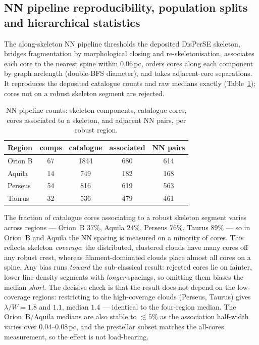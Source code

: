 \documentclass[usenatbib,twoside,twocolumn]{mnras}
\begin{document}
\subsection{NN pipeline reproducibility, population splits and hierarchical statistics}
\label{sec:nnpipeline}

The along-skeleton NN pipeline thresholds the deposited DisPerSE skeleton, bridges fragmentation by morphological closing and re-skeletonisation, associates each core to the nearest spine within $0.06$\,pc, orders cores along each component by graph arclength (double-BFS diameter), and takes adjacent-core separations. It reproduces the deposited catalogue counts and raw medians exactly (Table~\ref{tab:nnpipeline}); cores not on a robust skeleton segment are rejected.

\begin{table}
\caption{NN pipeline counts: skeleton components, catalogue cores, cores associated to a skeleton, and adjacent NN pairs, per robust region.}
\label{tab:nnpipeline}
\footnotesize
\setlength{\tabcolsep}{4pt}
\begin{tabular}{lcccc}
\toprule
Region & comps & catalogue & associated & NN pairs \\
\midrule
Orion B & 67 & 1844 & 680 & 614 \\
Aquila  & 14 & 749  & 182 & 168 \\
Perseus & 54 & 816  & 619 & 563 \\
Taurus  & 32 & 536  & 479 & 461 \\
\bottomrule
\end{tabular}
\end{table}

The fraction of catalogue cores associating to a robust skeleton segment varies across regions --- Orion~B $37\%$, Aquila $24\%$, Perseus $76\%$, Taurus $89\%$ --- so in Orion~B and Aquila the NN spacing is measured on a minority of cores. This reflects skeleton \emph{coverage}: the distributed, clustered clouds have many cores off any robust crest, whereas filament-dominated clouds place almost all cores on a spine. Any bias runs \emph{toward} the sub-classical result: rejected cores lie on fainter, lower-line-density segments with \emph{longer} spacings, so omitting them biases the median \emph{short}. The decisive check is that the result does not depend on the low-coverage regions: restricting to the high-coverage clouds (Perseus, Taurus) gives $\lambda/W=1.8$ and $1.1$, median $1.4$ --- identical to the four-region median. The Orion~B/Aquila medians are also stable to $\lesssim5\%$ as the association half-width varies over $0.04$--$0.08$\,pc, and the prestellar subset matches the all-cores measurement, so the effect is not load-bearing.
\end{document}

